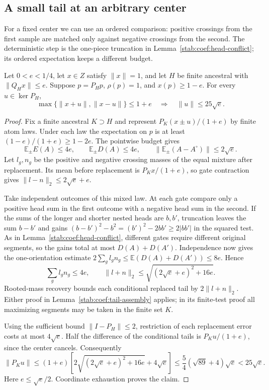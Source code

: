 \subsection{A small tail at an arbitrary center}

For a fixed center we can use an ordered comparison: positive
crossings from the first sample are matched only against negative
crossings from the second.  The deterministic step is the one-piece
truncation in Lemma~\ref{stab:coef:head-conflict}; its ordered
expectation keeps a different budget.

\begin{proposition}\label{stab:small-center-tail}
Let $0<e<1/4$, let $x\in Z$ satisfy $\|x\|=1$, and let $H$ be
finite ancestral with $\|Q_Hx\|\le e$.  Suppose $p=P_Hp$,
$\rho(p)=1$, and $x(p)\ge1-e$.  For every $u\in\ker P_H$,
\begin{equation}\label{stab:small-center-implication}
 \max\{\|x+u\|,\|x-u\|\}\le1+e
 \quad\Longrightarrow\quad \|u\|\le25\sqrt e.
\end{equation}
\end{proposition}

\begin{proof}
Fix a finite ancestral $K\supset H$ and represent
$P_K(x\pm u)/(1+e)$ by finite atom laws.  Under each law the
expectation on $p$ is at least $(1-e)/(1+e)\ge1-2e$.
The pointwise budget gives
\[
 \mathbb E_\pm E(A)\le4e,\qquad
 \mathbb E_\pm D(A)\le4e,\qquad
 \|\mathbb E_\pm(A-A^\circ)\|\le2\sqrt e.
\]
Let $l_g,n_g$ be the positive and negative crossing masses of the
equal mixture after replacement.  Its mean before replacement is
$P_Kx/(1+e)$, so gate contraction gives
$\|l-n\|_2\le2\sqrt e+e$.

Take independent outcomes of this mixed law.  At each gate compare
only a positive head sum in the first outcome with a negative head
sum in the second.  If the sums of the longer and shorter nested
heads are $b,b'$, truncation leaves the sum $b-b'$ and gains
$(b-b')^2-b^2=(b')^2-2bb'\ge2|bb'|$ in the squared test.
As in Lemma~\ref{stab:coef:head-conflict}, different gates require
different original segments, so the gains total at most $D(A)+D(A')$.
Independence now gives the one-orientation estimate
$2\sum_gl_gn_g\le\mathbb E(D(A)+D(A'))\le8e$.  Hence
\begin{equation}\label{stab:directional-mass}
 \sum_gl_gn_g\le4e,\qquad
 \|l+n\|_2\le\sqrt{(2\sqrt e+e)^2+16e}.
\end{equation}
Rooted-mass recovery bounds each conditional replaced tail by
$2\|l+n\|_2$.  Either proof in
Lemma~\ref{stab:coef:tail-assembly} applies; in its finite-test
proof all maximizing segments may be taken in the finite set $K$.

Using the sufficient bound $\|I-P_H\|\le2$, restriction of each
replacement error costs at most $4\sqrt e$.  Half the difference
of the conditional tails is $P_Ku/(1+e)$, since the center cancels.
Consequently
\[
 \|P_Ku\|\le(1+e)
 \left[2\sqrt{(2\sqrt e+e)^2+16e}+4\sqrt e\right]
 \le\frac54(\sqrt{89}+4)\sqrt e<25\sqrt e.
\]
Here $e\le\sqrt e/2$.  Coordinate exhaustion proves the claim.
\end{proof}


